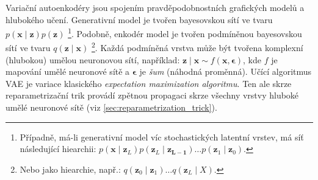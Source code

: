 Variační autoenkodéry jsou spojením pravděpodobnostních grafických modelů a hlubokého učení.
Generativní model je tvořen bayesovskou sítí ve tvaru $p(\mathbf{x}\mid\mathbf{z})p(\mathbf{z})$
\footnote{Případně, má-li generativní model víc stochastických latentní vrstev, má síť následující hiearchii: $p(\mathbf{x}\mid\mathbf{z}_L) p(\mathbf{z}_L\mid\mathbf{z_{L-1}}) \dots p(\mathbf{z}_1\mid\mathbf{z}_0)$.}.
Podobně, enkodér model je tvořen podmíněnou bayesovskou sítí ve tvaru $q(\mathbf{z}\mid\mathbf{x})$
\footnote{Nebo jako hiearchie, např.: $q(\mathbf{z}_0\mid\mathbf{z}_1) \dots q(\mathbf{z}_L \mid X)$.}.
Každá podmíněná vrstva může být tvořena komplexní (hlubokou) umělou neuronovou sítí, například: $\mathbf{z}\mid\mathbf{x} \sim f(\mathbf{x}, \mathbf{\epsilon})$, kde $f$ je mapování umělé neuronové sítě a $\mathbf{\epsilon}$ je \emph{šum} (náhodná proměnná).
Učící algoritmus VAE je variace klasického \emph{expectation maximization algoritmu}. Ten ale skrze reparametrizační trik provádí zpětnou propagaci skrze všechny vrstvy hluboké umělé neuronové sítě (viz \autoref{sec:reparametrization_trick}). \cite{Kingma2019}

\newpage
